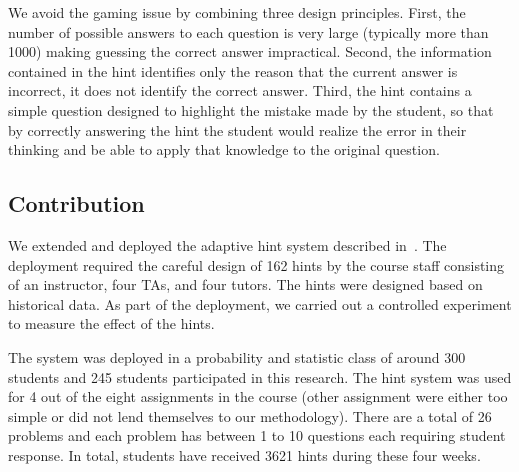 \documentclass{sigchi}
\begin{document}
We avoid the gaming issue by combining three design principles.
First, the number of possible answers to each question is very large (typically more than 1000) making guessing the correct answer impractical.  Second, the information contained in the hint
identifies only the reason that the current answer is incorrect, it
does not identify the correct answer. Third, the hint contains a
simple question designed to highlight the mistake made by the student, so that by correctly answering the hint the student would realize the error in their thinking and be able to apply that knowledge to the original question.

\subsection*{Contribution}

We extended and deployed the adaptive hint system described
in~\cite{ElkherjFreund14}. The deployment required the careful design of 162 hints by the course staff consisting of an instructor, four TAs, and four tutors. The hints were designed based on historical data. As part of the deployment, we carried out a controlled experiment to measure the effect of the hints. 

The system was deployed in a probability and statistic class of around 300 students and 245 students participated in this research. The hint system was used for 4 out of the eight assignments in the course (other assignment were either too simple or did not lend themselves to our methodology).  There are a total of 26 problems and each problem has between 1 to 10 questions each requiring student response. In total, students have received 3621 hints during these four weeks.
\end{document}
